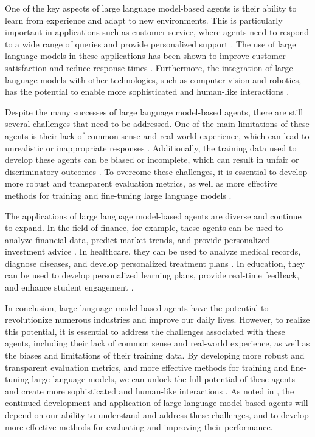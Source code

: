 \documentclass[11pt,a4paper]{article}
\begin{document}
One of the key aspects of large language model-based agents is their ability to learn from experience and adapt to new environments. This is particularly important in applications such as customer service, where agents need to respond to a wide range of queries and provide personalized support \cite{doi:10.1145/3624724}. The use of large language models in these applications has been shown to improve customer satisfaction and reduce response times \cite{doi:10.1109/mnet.2024.3435752}. Furthermore, the integration of large language models with other technologies, such as computer vision and robotics, has the potential to enable more sophisticated and human-like interactions \cite{arxiv:2401.13601}.

Despite the many successes of large language model-based agents, there are still several challenges that need to be addressed. One of the main limitations of these agents is their lack of common sense and real-world experience, which can lead to unrealistic or inappropriate responses \cite{doi:10.1016/j.tics.2023.08.006}. Additionally, the training data used to develop these agents can be biased or incomplete, which can result in unfair or discriminatory outcomes \cite{doi:10.1007/s10849-023-09409-x}. To overcome these challenges, it is essential to develop more robust and transparent evaluation metrics, as well as more effective methods for training and fine-tuning large language models \cite{doi:10.1145/3641289}.

The applications of large language model-based agents are diverse and continue to expand. In the field of finance, for example, these agents can be used to analyze financial data, predict market trends, and provide personalized investment advice \cite{doi:10.1145/3604237.3626869}. In healthcare, they can be used to analyze medical records, diagnose diseases, and develop personalized treatment plans \cite{doi:10.1007/s13042-024-02318-w}. In education, they can be used to develop personalized learning plans, provide real-time feedback, and enhance student engagement \cite{doi:10.1145/3649506}.

In conclusion, large language model-based agents have the potential to revolutionize numerous industries and improve our daily lives. However, to realize this potential, it is essential to address the challenges associated with these agents, including their lack of common sense and real-world experience, as well as the biases and limitations of their training data. By developing more robust and transparent evaluation metrics, and more effective methods for training and fine-tuning large language models, we can unlock the full potential of these agents and create more sophisticated and human-like interactions \cite{doi:10.3390/app14052074}. As noted in \cite{arxiv:2206.07682}, the continued development and application of large language model-based agents will depend on our ability to understand and address these challenges, and to develop more effective methods for evaluating and improving their performance. 
\end{document}
